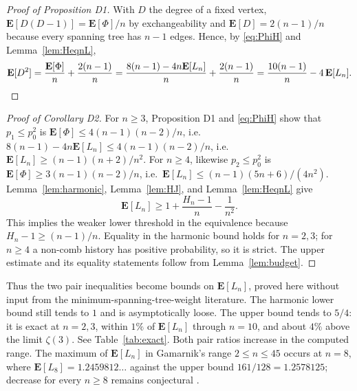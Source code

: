 \documentclass[10pt,a4paper]{amsart}
\newcommand{\E}{\mathbf{E}}
\begin{document}
\begin{proof}[Proof of Proposition D1]
With $D$ the degree of a fixed vertex, $\E[D(D-1)]=\E[\Phi]/n$ by exchangeability
and $\E[D]=2(n-1)/n$ because every spanning tree has $n-1$ edges. Hence, by
\eqref{eq:PhiH} and Lemma~\ref{lem:HeqnL},
\[
\E[D^2]=\frac{\E[\Phi]}n+\frac{2(n-1)}n
=\frac{8(n-1)-4n\E[L_n]}{n}+\frac{2(n-1)}n
=\frac{10(n-1)}n-4\,\E[L_n]. \qedhere
\]
\end{proof}

\begin{proof}[Proof of Corollary D2]
For $n\ge3$, Proposition D1 and \eqref{eq:PhiH} show that
$p_1\le p_0^2$ is
$\E[\Phi]\le4(n-1)(n-2)/n$, i.e.\ $8(n-1)-4n\E[L_n]\le4(n-1)(n-2)/n$, i.e.\
$\E[L_n]\ge(n-1)(n+2)/n^2$. For $n\ge4$, likewise $p_2\le p_0^2$ is
$\E[\Phi]\ge3(n-1)(n-2)/n$, i.e.\ $\E[L_n]\le(n-1)(5n+6)/(4n^2)$.
Lemma~\ref{lem:harmonic}, Lemma~\ref{lem:HJ}, and Lemma~\ref{lem:HeqnL} give
\[
\E[L_n]\ge1+\frac{H_n-1}{n}-\frac1{n^2}.
\]
This implies the weaker lower threshold in the equivalence because
$H_n-1\ge(n-1)/n$. Equality in the harmonic bound holds for $n=2,3$; for
$n\ge4$ a non-comb history has positive probability, so it is strict. The
upper estimate and its equality statements follow from Lemma~\ref{lem:budget}.
\end{proof}

Thus the two pair inequalities become bounds on $\E[L_n]$, proved here without
input from the minimum-spanning-tree-weight literature. The harmonic lower bound
still tends to $1$ and is asymptotically loose. The upper bound tends to $5/4$:
it is exact at $n=2,3$, within $1\%$ of $\E[L_n]$ through $n=10$, and about
$4\%$ above the limit $\zeta(3)$. See Table~\ref{tab:exact}. Both pair ratios
increase in the computed range. The maximum
of $\E[L_n]$ in Gamarnik's range $2\le n\le45$ occurs at $n=8$, where
$\E[L_8]=1.2459812\ldots$ against the upper bound $161/128=1.2578125$;
decrease for every $n\ge8$ remains conjectural \cite[Conjecture 4.1]{Gamarnik}.
\end{document}
